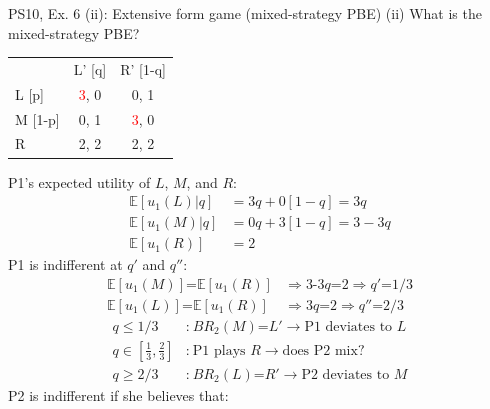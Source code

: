 \begin{frame}{PS10, Ex. 6 (ii): Extensive form game (mixed-strategy PBE)}
    (ii) What is the mixed-strategy PBE? \vspace{-10pt}
    \begin{multicols}{2}
      \begin{table}
        \begin{tabular}{l|c|c|}
          \multicolumn{1}{c}{} & \multicolumn{1}{c}{L' [q]} & \multicolumn{1}{c}{R' [1-q]} \\\cline{2-3}
          L [p]   & \textcolor{red}{3}, 0 & 0, \color{blue}1 \\\cline{2-3}
          M [1-p] & 0, \color{blue}1 & \textcolor{red}{3}, 0 \\\cline{2-3}
          R       & 2, \color{blue}2 & 2, \color{blue}2 \\\cline{2-3}
        \end{tabular}
      \end{table} \vspace{-6pt}
      P1's expected utility of $L$, $M$, and $R$: \vspace{-8pt}
      \begin{align*}
        \mathbb{E}[u_1(L)|q]&=3q+0[1-q]=3q\\
        \mathbb{E}[u_1(M)|q]&=0q+3[1-q]=3-3q\\
        \mathbb{E}[u_1(R)]&=2
      \end{align*}
      P1 is indifferent at $q'$ and $q''$: \vspace{-8pt}
      \begin{align*}
        \mathbb{E}[u_1(M)]\text{=}\mathbb{E}[u_1(R)]&\Rightarrow \text{3-3}q\text{=}2\Rightarrow q'\text{=}1/3\\
        \mathbb{E}[u_1(L)]\text{=}\mathbb{E}[u_1(R)]&\Rightarrow 3q\text{=}2\Rightarrow q''\text{=}2/3
      \end{align*} \vspace{-22pt}
      \begin{align*}
        q\leq1/3&\text{:}\ BR_2(M)\text{=}L'\rightarrow\text{P1 deviates to }L\\
        q\text{$\in$}{\textstyle\left[\frac{1}{3},\frac{2}{3}\right]}&\text{:}\ \text{P1 plays }R\rightarrow\text{does P2 mix?}\\
        q\geq2/3&\text{:}\ BR_2(L)\text{=}R'\rightarrow\text{P2 deviates to }M
      \end{align*}
      P2 is indifferent if she believes that: \vspace{-8pt}

\end{multicols}
\end{frame}
